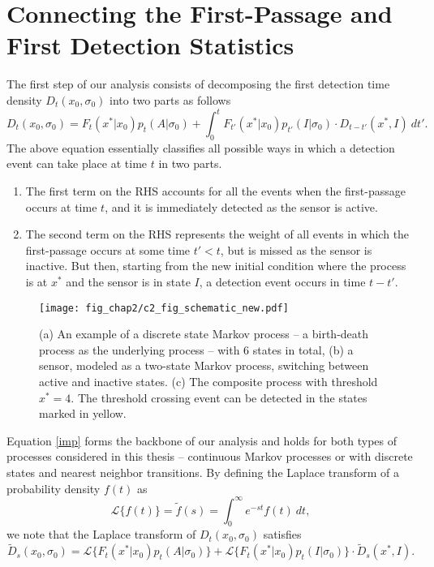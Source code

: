 \section{Connecting the First-Passage and First Detection Statistics}

The first step of our analysis consists of decomposing the first detection time density $D_t(x_0,\sigma_0)$ into two parts as follows
\begin{equation}
    D_t(x_0,\sigma_0) = F_t(x^*|x_0)p_t(A|\sigma_0) + \int_0^t  F_{t'}(x^*|x_0)p_{t'}(I|\sigma_0) \cdot D_{t-t'}(x^*,I) ~dt'. \label{imp}
\end{equation}
The above equation essentially classifies all possible ways in which a detection event can take place at time $t$ in two parts.
\begin{enumerate}
    \item The first term on the RHS accounts for all the events when the first-passage occurs at time $t$, and it is immediately detected as the sensor is active.
    \item The second term on the RHS represents the weight of all events in which the first-passage occurs at some time $t'<t$, but is missed as the sensor is inactive. But then, starting from the new initial condition where the process is at $x^*$ and the sensor is in state $I$, a detection event occurs in time $t-t'$.
\end{enumerate}
\begin{figure}
    \centering
    \texttt{[image: fig\_chap2/c2\_fig\_schematic\_new.pdf]}
    \caption{(a) An example of a discrete state Markov process -- a birth-death process as the underlying process -- with $6$ states in total, (b) a sensor, modeled as a two-state Markov process, switching between active and inactive states. (c) The composite process with threshold $x^*=4$. The threshold crossing event can be detected in the states marked in yellow.}
  \label{fig1}
\end{figure}
Equation \eqref{imp} forms the backbone of our analysis and holds for both types of processes considered in this thesis -- continuous Markov processes or with discrete states and nearest neighbor transitions. By defining the Laplace transform of a probability density $f(t)$ as
\begin{equation}
    \mathcal{L} \{ f(t) \} = \widetilde{f}(s) = \int_0^\infty e^{-st} f(t) ~dt,
\end{equation}
we note that the Laplace transform of $D_t(x_0,\sigma_0)$ satisfies
\begin{equation}
    \widetilde{D}_s(x_0,\sigma_0) = \mathcal{L} \{ F_t(x^*|x_0)p_t(A|\sigma_0) \} + \mathcal{L} \{ F_{t}(x^*|x_0)p_{t}(I|\sigma_0) \} \cdot \widetilde{D}_{s}(x^*,I).  \label{imp_lap}
\end{equation}
